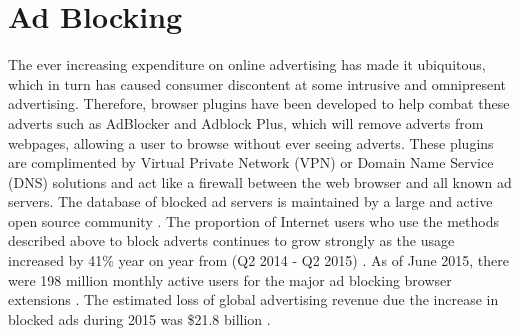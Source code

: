 \documentclass[12pt]{article}
\begin{document}
\section{Ad Blocking}
The ever increasing expenditure on online advertising has made it ubiquitous, which in turn has caused consumer discontent at some intrusive and omnipresent advertising. Therefore, browser plugins have been developed to help combat these adverts such as AdBlocker and Adblock Plus, which will remove adverts from webpages, allowing a user to browse without ever seeing adverts. These plugins are complimented by Virtual Private Network (VPN) or Domain Name Service (DNS) solutions and act like a firewall between the web browser and all known ad servers. The database of blocked ad servers is maintained by a large and active open source community \parencite{adobeAdBlock}. The proportion of Internet users who use the methods described above to block adverts continues to grow strongly as the usage increased by 41\% year on year from (Q2 2014 - Q2 2015) \parencite{adobeAdBlock}. As of June 2015, there were 198 million monthly active users for the major ad blocking browser extensions \parencite{adobeAdBlock}. The estimated loss of global advertising revenue due the increase in blocked ads during 2015 was \$21.8 billion \parencite{adobeAdBlock}. \\
\end{document}
